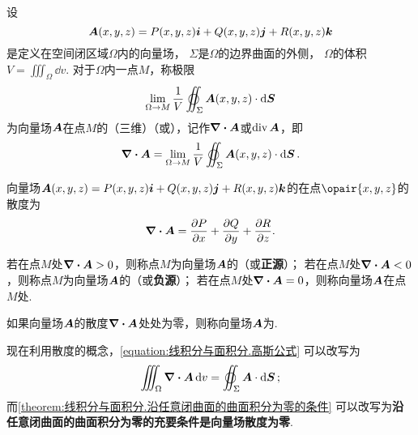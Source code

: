 \begin{definition}[空间中的散度]
\def\defofdiv{\lim\limits_{\Omega \to M} \frac{1}{V} \varoiint_{\Sigma} \mat{A}(x,y,z) \cdot \dd{\mat{S}}}%
设\[
\boldsymbol{A}(x,y,z)=P(x,y,z)\boldsymbol{i}+Q(x,y,z)\boldsymbol{j}+R(x,y,z)\boldsymbol{k}
\]是定义在空间闭区域\(\Omega\)内的向量场，%
\(\Sigma\)是\(\Omega\)的边界曲面的外侧，%
\(\Omega\)的体积\(V = \iiint_{\Omega} \dd{v}\).
对于\(\Omega\)内一点\(M\)，称极限\[
\defofdiv
\]为向量场\(\boldsymbol{A}\)在点\(M\)的（三维）（或），记作\(\div{\boldsymbol{A}}\)或\(\operatorname{div}\boldsymbol{A}\)，即\[
\div{\mat{A}} = \defofdiv.
\]
\end{definition}

\begin{theorem}
向量场\(\boldsymbol{A}(x,y,z)=P(x,y,z)\boldsymbol{i}+Q(x,y,z)\boldsymbol{j}+R(x,y,z)\boldsymbol{k}\)的在点\(\opair{x,y,z}\)的散度为\[
\div{\boldsymbol{A}} = \pdv{P}{x}+\pdv{Q}{y}+\pdv{R}{z}.
\]
\end{theorem}

\begin{definition}
若在点\(M\)处\(\div{\boldsymbol{A}}>0\)，则称点\(M\)为向量场\(\boldsymbol{A}\)的（或\textbf{正源}）；%
若在点\(M\)处\(\div{\boldsymbol{A}}<0\)，则称点\(M\)为向量场\(\boldsymbol{A}\)的（或\textbf{负源}）；%
若在点\(M\)处\(\div{\boldsymbol{A}}=0\)，则称向量场\(\boldsymbol{A}\)在点\(M\)处.

如果向量场\(\boldsymbol{A}\)的散度\(\div{\boldsymbol{A}}\)处处为零，则称向量场\(\boldsymbol{A}\)为.
\end{definition}

现在利用散度的概念，\cref{equation:线积分与面积分.高斯公式} 可以改写为
\begin{equation}\label{equation:线积分与面积分.高斯公式1}
\iiint_{\Omega} \div{\mat{A}} \dd{v} = \varoiint_{\Sigma} \mat{A} \cdot \dd{\mat{S}};
\end{equation}而\cref{theorem:线积分与面积分.沿任意闭曲面的曲面积分为零的条件} 可以改写为\textbf{沿任意闭曲面的曲面积分为零的充要条件是向量场散度为零}.


